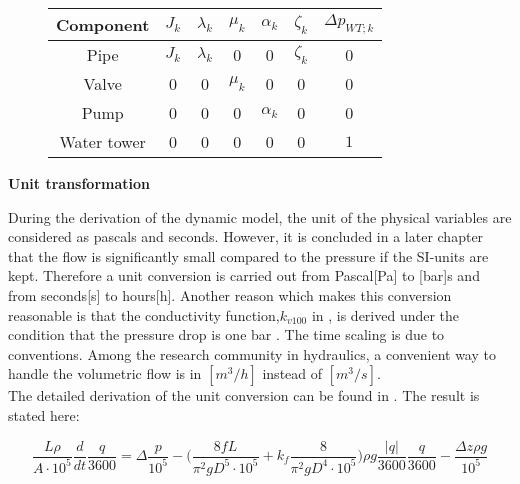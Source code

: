 \begin{figure}[H]
	\centering
\begin{tabular}{c|cccccc} 
		\bfseries Component    &     $J_k$  &$\lambda_k$    &    $\mu_k$    &   $\alpha_k$   &  $\zeta_k$   &  $\Delta p_{WT;k}$ \\\hline
		Pipe			  	   &     $J_k$  &$\lambda_k$    &    0          &   0            &  $\zeta_k$   &  0	    			\\ 
		Valve       	       &     0      &0              &    $\mu_k$    &   0 		     &  0    		&  0					\\ 
		Pump 		    	   &     0      &0              &    0          &   $\alpha_k$   &  0    		&  0	    			\\
		Water tower 	   	   &     0      &0              &    0          &   0            &  0    		&  $1$	
\end{tabular}
		\label{tab:parametrization_model}

\end{figure}	

\textbf{Unit transformation}
\label{unittransform}

During the derivation of the dynamic model, the unit of the physical variables are considered as pascals and seconds. However, it is concluded in a later chapter that the flow is significantly small compared to the pressure if the SI-units are kept. Therefore a unit conversion is carried out from Pascal[Pa] to [bar]s and from seconds[s] to hours[h].  Another reason which makes this conversion reasonable is that the conductivity function,$k_{v100}$ in , is derived under the condition that the pressure drop is one bar \cite{keller}. The time scaling is due to conventions. Among the research community in hydraulics, a convenient way to handle the volumetric flow is in $[m^3/h]$ instead of $[m^3/s]$. 
\\
The detailed derivation of the unit conversion can be found in . The result is stated here: 

\begin{equation}
   \frac{L \rho}{A\cdot10^5} \frac{d}{dt}\frac{q}{3600} = \Delta \frac{p}{10^5} - \Big(\frac{8fL}{\pi^{2}gD^5\cdot10^5} + k_f \frac{8}{\pi^2gD^4\cdot10^5}\Big) \rho g \frac{|q|}{3600} \frac{q}{3600} - \frac{\Delta z \rho g}{10^5}
\end{equation}
